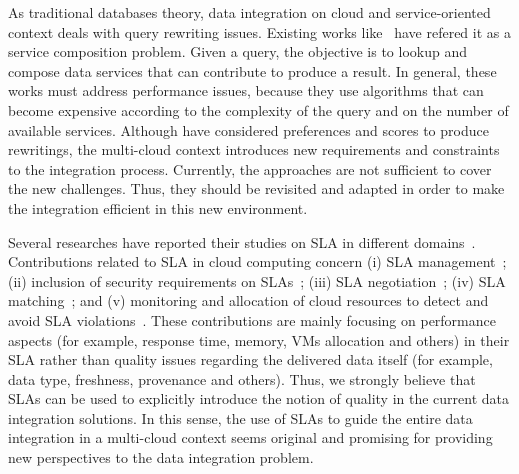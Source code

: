 As traditional databases theory, data integration on cloud and service-oriented context deals with query rewriting issues. Existing works like~\cite{ba2014,Barhamgi2010,Benouaret2011,Umberto} have refered it as a service composition problem. Given a query, the objective is to lookup and compose data services that can contribute to produce a result. In general, these works must address performance issues, because they use algorithms that can become expensive according to the complexity of the query and on the number of available services. Although \cite{ba2014,Benouaret2011} have considered preferences and scores to produce rewritings, the multi-cloud context introduces new requirements and constraints to the integration process. Currently, the approaches are not sufficient to cover the new challenges. Thus, they should be revisited and adapted in order to make the integration efficient in this new environment. 

Several researches have reported their studies on SLA in different domains~\cite{AlhamadDC11}.
Contributions related to SLA in cloud computing concern (i) SLA management~\cite{Mavrogeorgi2013}; 
(ii) inclusion of security requirements on SLAs~\cite{rak2013}; (iii) SLA negotiation~\cite{Falasi2016, Son2014}; (iv) SLA matching~\cite{Redl2012}; and (v) monitoring and allocation of cloud resources to detect and avoid SLA violations~\cite{Leitner2010}. 
These contributions are mainly focusing on performance aspects (for example, response time, memory, VMs allocation and others) in their SLA rather than quality issues regarding the delivered data itself (for example, data type, freshness, provenance and others).
Thus, we strongly believe that SLAs can be used  to explicitly introduce the notion of quality in the current data integration solutions. 
In this sense, the use of SLAs to guide the entire data integration in a multi-cloud context seems original and promising for providing new perspectives to the data integration problem.




